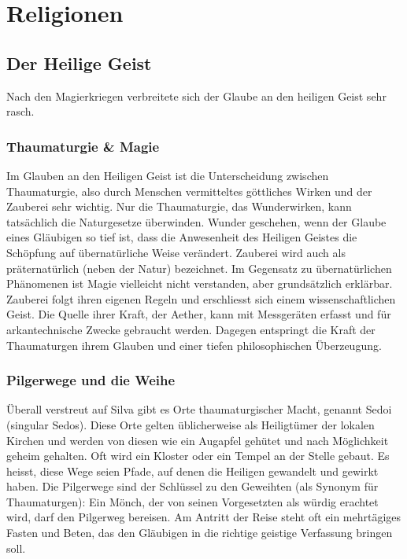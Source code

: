 \documentclass[12pt,twoside,twocolumn,openany]{book}
\begin{document}
	

	
\section{Religionen}

 \subsection{Der Heilige Geist}
 Nach den Magierkriegen verbreitete sich der Glaube an den heiligen Geist sehr rasch.
 
	\subsubsection{Thaumaturgie \& Magie}
	Im Glauben an den Heiligen Geist ist die Unterscheidung zwischen Thaumaturgie, also durch Menschen vermitteltes göttliches Wirken und der Zauberei sehr wichtig. Nur die Thaumaturgie, das Wunderwirken, kann tatsächlich die Naturgesetze überwinden. Wunder geschehen, wenn der Glaube eines Gläubigen so tief ist, dass die Anwesenheit des Heiligen Geistes die Schöpfung auf übernatürliche Weise verändert. Zauberei wird auch als präternatürlich (neben der Natur) bezeichnet. Im Gegensatz zu übernatürlichen Phänomenen ist Magie vielleicht nicht verstanden, aber grundsätzlich erklärbar.
	Zauberei folgt ihren eigenen Regeln und erschliesst sich einem wissenschaftlichen Geist. Die Quelle ihrer Kraft, der Aether, kann mit Messgeräten erfasst und für arkantechnische Zwecke gebraucht werden. Dagegen entspringt die Kraft der Thaumaturgen ihrem Glauben und einer tiefen philosophischen Überzeugung.
	
	\subsubsection{Pilgerwege und die Weihe}
	Überall verstreut auf Silva gibt es Orte thaumaturgischer Macht, genannt Sedoi (singular Sedos). Diese Orte gelten üblicherweise als Heiligtümer der lokalen Kirchen und werden von diesen wie ein Augapfel gehütet und nach Möglichkeit geheim gehalten. Oft wird ein Kloster oder ein Tempel an der Stelle gebaut. Es heisst, diese Wege seien Pfade, auf denen die Heiligen gewandelt und gewirkt haben. Die Pilgerwege sind der Schlüssel zu den Geweihten (als Synonym für Thaumaturgen): Ein Mönch, der von seinen Vorgesetzten als würdig erachtet wird, darf den Pilgerweg bereisen. Am Antritt der Reise steht oft ein mehrtägiges Fasten und Beten, das den Gläubigen in die richtige geistige Verfassung bringen soll.
	
\end{document}
